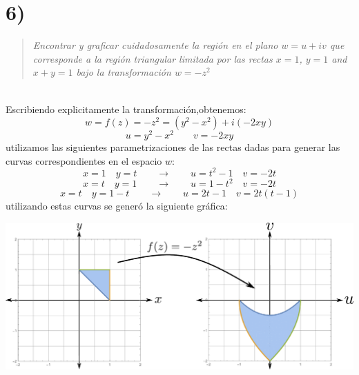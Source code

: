 \documentclass{article}
\begin{document}
\section*{6)}
\begin{quote}
\textit{Encontrar y graficar cuidadosamente la región en el plano $w = u + iv$ que corresponde a la región triangular limitada por las rectas $x = 1$, $y = 1$ and $x+y = 1$ bajo la transformación $w = -z^2$}
\end{quote}\hspace{0.25cm}\\
Escribiendo explicitamente la transformación,obtenemos:
$$w=f(z)=-z^2=(y^2-x^2)+i(-2xy)$$
$$u=y^2-x^2 \qquad v=-2xy$$
utilizamos las siguientes parametrizaciones de las rectas dadas para generar las curvas correspondientes en el espacio $w$:
$$x=1 \quad y=t \qquad \rightarrow \qquad u=t^2-1 \quad v=-2t $$
$$x=t \quad y=1 \qquad \rightarrow \qquad u=1-t^2 \quad v=-2t $$
$$x=t \quad y=1-t \qquad \rightarrow \qquad u=2t-1 \quad v=2t(t-1) $$
utilizando estas curvas se generó la siguiente gráfica:
\begin{center}
\includegraphics[scale=0.45]{fig7.pdf}
\end{center}
\end{document}

